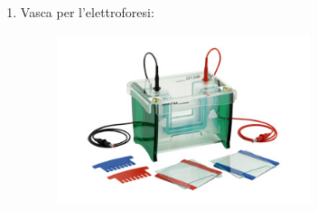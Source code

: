 \documentclass{article}
\begin{document}
\begin{enumerate}
\begin{figure}[H]
		\end{figure}

		\vspace{0.5cm}


		\item Vasca per l'elettroforesi:

		\begin{figure}[H]

			\includegraphics[width=0.7\textwidth]{./immagini/vasca_elettroforesi.jpg}
			\label{vasca_elettroforesi}

		\end{figure}

		\vspace{0.5cm}

	\end{enumerate}


	\newpage
	
	\newpage
	
	\newpage
	
	\newpage
	
	\newpage
\end{document}
